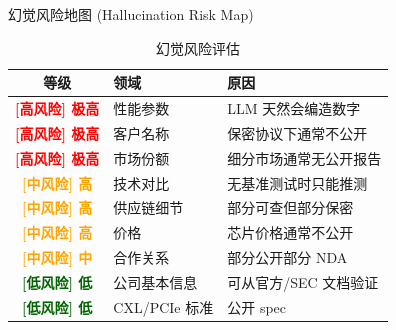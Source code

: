 \documentclass[UTF8,11pt,aspectratio=169]{beamer}
\newcommand{\risk}[1]{\textcolor{red}{\textbf{[高风险] #1}}}
\newcommand{\mediumrisk}[1]{\textcolor{orange}{\textbf{[中风险] #1}}}
\newcommand{\lowrisk}[1]{\textcolor{darkgreen}{\textbf{[低风险] #1}}}
\begin{document}
\begin{frame}{幻觉风险地图 (Hallucination Risk Map)}
    \begin{table}
        \centering
        \caption{幻觉风险评估}
        \begin{tabular}{clp{}}
            \toprule
            \textbf{等级} & \textbf{领域} & \textbf{原因} \\
            \midrule
            \rowcolor{red!15}
            \risk{极高} & 性能参数 & LLM 天然会编造数字 \\
            \rowcolor{red!15}
            \risk{极高} & 客户名称 & 保密协议下通常不公开 \\
            \rowcolor{red!15}
            \risk{极高} & 市场份额 & 细分市场通常无公开报告 \\
            \rowcolor{orange!15}
            \mediumrisk{高} & 技术对比 & 无基准测试时只能推测 \\
            \rowcolor{orange!15}
            \mediumrisk{高} & 供应链细节 & 部分可查但部分保密 \\
            \rowcolor{orange!15}
            \mediumrisk{高} & 价格 & 芯片价格通常不公开 \\
            \rowcolor{yellow!15}
            \mediumrisk{中} & 合作关系 & 部分公开部分 NDA \\
            \rowcolor{darkgreen!10}
            \lowrisk{低} & 公司基本信息 & 可从官方/SEC 文档验证 \\
            \rowcolor{darkgreen!10}
            \lowrisk{低} & CXL/PCIe 标准 & 公开 spec \\
            \bottomrule
        \end{tabular}
    \end{table}
\end{frame}
\end{document}
